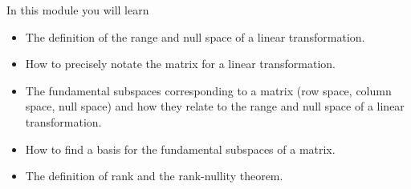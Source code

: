 \begin{module}

	In this module you will learn
	\begin{itemize}
		\item The definition of the range and null space of a linear transformation.
		\item How to precisely notate the matrix for a linear transformation.
		\item The fundamental subspaces corresponding to a matrix (row space, column space,
			null space) and how they relate to the range and null space of a linear transformation.
		\item How to find a basis for the fundamental subspaces of a matrix.
		\item The definition of rank and the rank-nullity theorem.
	\end{itemize}

	
	
\end{module}

	\bookonlynewpage

